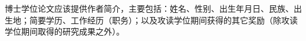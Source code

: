 \begin{authorintro}
博士学位论文应该提供作者简介，主要包括：姓名、性别、出生年月日、民族、出生地；简要学历、工作经历（职务）；以及攻读学位期间获得的其它奖励（除攻读学位期间取得的研究成果之外）。
\end{authorintro}

